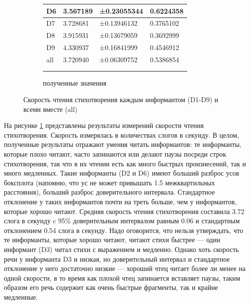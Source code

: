 \begin{figure}[t]
\begin{subfigure}[b]{0.45\textwidth}
\begin{tabular}{|l|l|l|l|}
D6 & 3.567189 & ±0.23055344 & 0.6224358 \\ \hline
D7 & 3.728681 & ±0.13946132 & 0.3765102 \\ \hline
D8 & 3.915931 & ±0.13679059 & 0.3692999 \\ \hline
D9 & 4.330937 & ±0.16841999 & 0.4546912 \\ \hline
all & 3.720940 & ±0.06309752 & 0.5386854 \\ \hline
\multicolumn{1}{c}{}&\multicolumn{1}{c}{}&\multicolumn{1}{c}{}&\multicolumn{1}{c}{}\\
\multicolumn{1}{c}{}&\multicolumn{1}{c}{}&\multicolumn{1}{c}{}&\multicolumn{1}{c}{}\\
\end{tabular}
\normalsize
\caption{полученные значения}        
\end{subfigure}
\caption{Скорость чтения стихотворения каждым информантом (D1-D9) и всеми вместе (all)}
\label{verseboxplot}
\end{figure}
\par На рисунке \ref{verseboxplot} представлены результаты измерений скорости чтения стихотворения. Скорость измерялась в количествах слогов в секунду. В целом, полученные результаты отражают умения читать информантов: те информанты, которые плохо читают, часто запинаются или делают паузы посреди строк стихотворения, так что в их чтении есть как много быстрых произнесений, так и много медленных. Такие информанты (D2 и D6) имеют больший разброс усов боксплота (напомню, что ус не может привышать 1.5 межквартильных расстояния), больший разброс доверительного интервала. Стандартное отклонение у таких информантов почти на треть больше, чем у информантов, которые хорошо читают. Средняя скорость чтения стихотворения составила 3.72 слога в секунду c 95\% доверительным интервалом равным 0.06 и стандартным отклонением 0.54 слога в секунду. Надо оговорится, что нельзя утверждать, что те информанты, которые хорошо читают, читают стихи быстрее --- один информант (D3) читал стихи с выражением и медленно. Однако хоть скорость речи у информанта D3 и низкая, но доверительный интервал и стандартное отклонение у него достаточно низкие --- хороший чтец читает более ли менее на одной скорости, в то время как плохой чтец запинается вставляет паузы, таким образом его речь содержит как очень быстрые фрагменты, так и крайне медленные.
